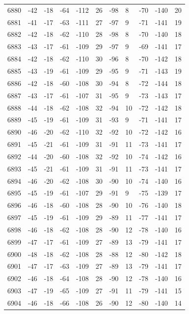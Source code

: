 \begin{table}[H]
\begin{tabular}{lllllllllll}
6880 & -42 & -18 & -64 & -112 & 26 & -98 & 8 & -70 & -140 & 20 \\
6881 & -41 & -17 & -63 & -111 & 27 & -97 & 9 & -71 & -141 & 19 \\
6882 & -42 & -18 & -62 & -110 & 28 & -98 & 8 & -70 & -140 & 18 \\
6883 & -43 & -17 & -61 & -109 & 29 & -97 & 9 & -69 & -141 & 17 \\
6884 & -42 & -18 & -62 & -110 & 30 & -96 & 8 & -70 & -142 & 18 \\
6885 & -43 & -19 & -61 & -109 & 29 & -95 & 9 & -71 & -143 & 19 \\
6886 & -42 & -18 & -60 & -108 & 30 & -94 & 8 & -72 & -144 & 18 \\
6887 & -43 & -17 & -61 & -107 & 31 & -95 & 9 & -73 & -143 & 17 \\
6888 & -44 & -18 & -62 & -108 & 32 & -94 & 10 & -72 & -142 & 18 \\
6889 & -45 & -19 & -61 & -109 & 31 & -93 & 9 & -71 & -141 & 17 \\
6890 & -46 & -20 & -62 & -110 & 32 & -92 & 10 & -72 & -142 & 16 \\
6891 & -45 & -21 & -61 & -109 & 31 & -91 & 11 & -73 & -141 & 17 \\
6892 & -44 & -20 & -60 & -108 & 32 & -92 & 10 & -74 & -142 & 16 \\
6893 & -45 & -21 & -61 & -109 & 31 & -91 & 11 & -73 & -141 & 17 \\
6894 & -46 & -20 & -62 & -108 & 30 & -90 & 10 & -74 & -140 & 16 \\
6895 & -45 & -19 & -61 & -107 & 29 & -91 & 9 & -75 & -139 & 17 \\
6896 & -46 & -18 & -60 & -108 & 28 & -90 & 10 & -76 & -140 & 18 \\
6897 & -45 & -19 & -61 & -109 & 29 & -89 & 11 & -77 & -141 & 17 \\
6898 & -46 & -18 & -62 & -108 & 28 & -90 & 12 & -78 & -140 & 16 \\
6899 & -47 & -17 & -61 & -109 & 27 & -89 & 13 & -79 & -141 & 17 \\
6900 & -48 & -18 & -62 & -108 & 28 & -88 & 12 & -80 & -142 & 18 \\
6901 & -47 & -17 & -63 & -109 & 27 & -89 & 13 & -79 & -141 & 17 \\
6902 & -46 & -18 & -64 & -108 & 28 & -90 & 12 & -78 & -140 & 16 \\
6903 & -47 & -19 & -65 & -109 & 27 & -91 & 11 & -79 & -141 & 15 \\
6904 & -46 & -18 & -66 & -108 & 26 & -90 & 12 & -80 & -140 & 14 \\

\end{tabular}
\end{table}
